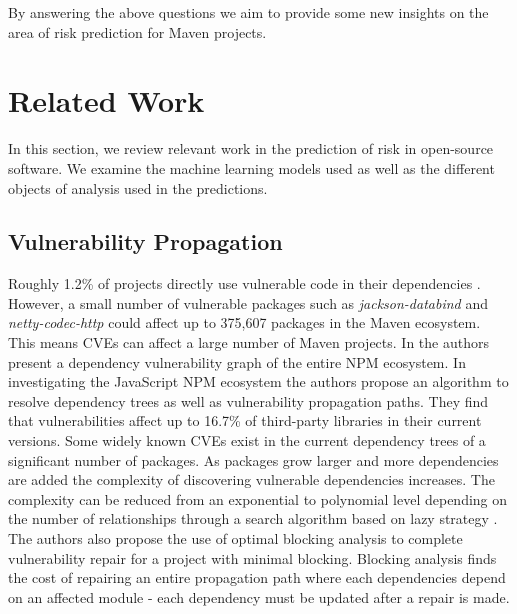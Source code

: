 \documentclass[conference]{IEEEtran}
\begin{document}
By answering the above questions we aim to provide some new insights on the area of risk prediction for Maven projects. 

\section{Related Work}
In this section, we review relevant work in the prediction of risk in open-source software. We examine the machine learning models used as well as the different objects of analysis used in the predictions.  

\subsection{Vulnerability Propagation}
Roughly 1.2\% of projects directly use vulnerable code in their dependencies \cite{a_m_mir_effect_2023}. However, a small number of vulnerable packages such as \textit{jackson-databind} and \textit{netty-codec-http} could affect up to 375,607 packages in the Maven ecosystem. This means CVEs can affect a large number of Maven projects. In \cite{c_liu_demystifying_2022} the authors present a dependency vulnerability graph of the entire NPM ecosystem. In investigating the JavaScript NPM ecosystem the authors propose an algorithm to resolve dependency trees as well as vulnerability propagation paths. They find that vulnerabilities affect up to 16.7\% of third-party libraries in their current versions. Some widely known CVEs exist in the current dependency trees of a significant number of packages. As packages grow larger and more dependencies are added the complexity of discovering vulnerable dependencies increases. The complexity can be reduced from an exponential to polynomial level depending on the number of relationships through a search algorithm based on lazy strategy \cite{w_hu_open_2019}. The authors also propose the use of optimal blocking analysis to complete vulnerability repair for a project with minimal blocking. Blocking analysis finds the cost of repairing an entire propagation path where each dependencies depend on an affected module - each dependency must be updated after a repair is made. 
\end{document}
